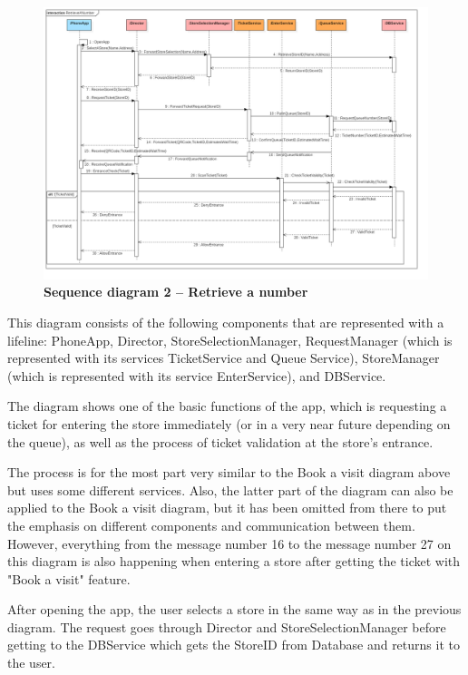 \begin{figure}[!h]
\centering
\includegraphics[width=\textwidth]{Images/SequenceDiagramComponents2_RetrieveANumber}
\caption{\label{fig:seqdiagram2}\textbf{Sequence diagram 2 – Retrieve a number}}
\end{figure}

This diagram consists of the following components that are represented with a lifeline: PhoneApp, Director, StoreSelectionManager, RequestManager (which is represented with its services TicketService and Queue Service), StoreManager (which is represented with its service EnterService), and DBService.  

  

The diagram shows one of the basic functions of the app, which is requesting a ticket for entering the store immediately (or in a very near future depending on the queue), as well as the process of ticket validation at the store's entrance.   

  

The process is for the most part very similar to the Book a visit diagram above but uses some different services. Also, the latter part of the diagram can also be applied to the Book a visit diagram, but it has been omitted from there to put the emphasis on different components and communication between them. However, everything from the message number 16 to the message number 27 on this diagram is also happening when entering a store after getting the ticket with "Book a visit" feature.   

  

After opening the app, the user selects a store in the same way as in the previous diagram. The request goes through Director and StoreSelectionManager before getting to the DBService which gets the StoreID from Database and returns it to the user.  

